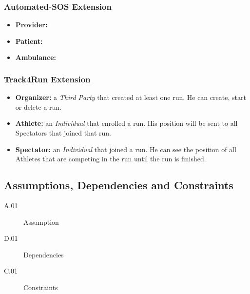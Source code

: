\documentclass[a4paper]{article}
\begin{document}
        \subsubsection{Automated-SOS Extension}
        \begin{itemize}
            \item \textbf{Provider:}
            \item \textbf{Patient:}
            \item \textbf{Ambulance:}
        \end{itemize}
        
        
        \subsubsection{Track4Run Extension}
        \begin{itemize}
            \item \textbf{Organizer:} a \textit{Third Party} that created at least one run. He can create, start or delete a run.
            \item \textbf{Athlete:} an \textit{Individual} that enrolled a run. His position will be sent to all Spectators that joined that run.
            \item \textbf{Spectator:} an \textit{Individual} that joined a run. He can see the position of all Athletes that are competing in the run until the run is finished.
        \end{itemize}
        
    \subsection{Assumptions, Dependencies and Constraints}
        \begin{description}
            \item[A.01] Assumption
        \end{description}
        
        \begin{description}
            \item[D.01] Dependencies
        \end{description}
        
        \begin{description}
            \item[C.01] Constraints
        \end{description}
\newpage
\end{document}
